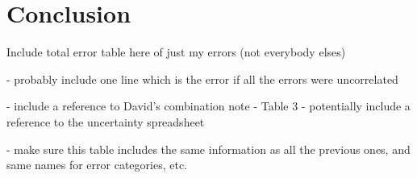
\section{Conclusion}



Include total error table here of just my errors (not everybody elses)

- probably include one line which is the error if all the errors were uncorrelated

- include a reference to David's combination note \cite{CombinationNote} - Table 3 
- potentially include a reference to the uncertainty spreadsheet \cite{UncertaintySpreadsheet}


- make sure this table includes the same information as all the previous ones, and same names for error categories, etc.

